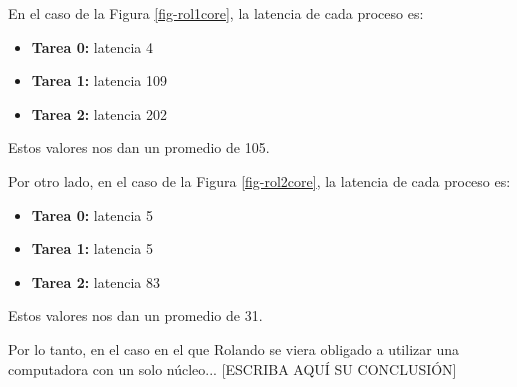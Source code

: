 En el caso de la Figura \ref{fig-rol1core}, la latencia de cada proceso es:

\begin{itemize}
	\item {\bf Tarea 0:} latencia 4
	\item {\bf Tarea 1:} latencia 109
	\item {\bf Tarea 2:} latencia 202
\end{itemize}

Estos valores nos dan un promedio de 105.

Por otro lado, en el caso de la Figura \ref{fig-rol2core}, la latencia de cada proceso es:

\begin{itemize}
	\item {\bf Tarea 0:} latencia 5
	\item {\bf Tarea 1:} latencia 5
	\item {\bf Tarea 2:} latencia 83
\end{itemize}

Estos valores nos dan un promedio de 31.

Por lo tanto, en el caso en el que Rolando se viera obligado a utilizar una computadora con un solo núcleo... [ESCRIBA AQUÍ SU CONCLUSIÓN]
